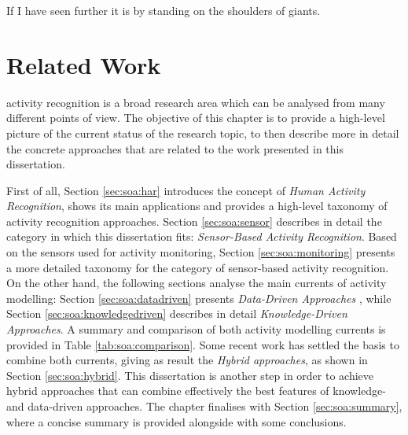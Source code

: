 

\begin{savequote}[50mm]
If I have seen further it is by standing on the shoulders of giants.
\end{savequote}

\chapter{Related Work}
\label{cha:soa}

\ifpdf
    \graphicspath{{2_state_of_the_art/figures/PDF/}{2_state_of_the_art/figures/PNG/}{2_state_of_the_art/figures/}}
\else
    \graphicspath{{2_state_of_the_art/figures/EPS/}{2_state_of_the_art/figures/}}
\fi


 activity recognition is a broad research area which can be analysed from many different points of view. The objective of this chapter is to provide a high-level picture of the current status of the research topic, to then describe more in detail the concrete approaches that are related to the work presented in this dissertation. 

First of all, Section \ref{sec:soa:har} introduces the concept of \textit{Human Activity Recognition}, shows its main applications and provides a high-level taxonomy of activity recognition approaches. Section \ref{sec:soa:sensor} describes in detail the category in which this dissertation fits: \textit{Sensor-Based Activity Recognition}. Based on the sensors used for activity monitoring, Section \ref{sec:soa:monitoring} presents a more detailed taxonomy for the category of sensor-based activity recognition. On the other hand, the following sections analyse the main currents of activity modelling: Section \ref{sec:soa:datadriven} presents \textit{Data-Driven Approaches} , while Section \ref{sec:soa:knowledgedriven} describes in detail \textit{Knowledge-Driven Approaches}. A summary and comparison of both activity modelling currents is provided in Table \ref{tab:soa:comparison}. Some recent work has settled the basis to combine both currents, giving as result the \textit{Hybrid approaches}, as shown in Section \ref{sec:soa:hybrid}. This dissertation is another step in order to achieve hybrid approaches that can combine effectively the best features of knowledge- and data-driven approaches. The chapter finalises with Section \ref{sec:soa:summary}, where a concise summary is provided alongside with some conclusions.